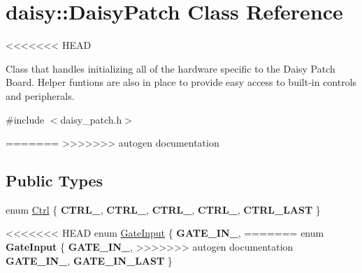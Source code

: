\hypertarget{classdaisy_1_1_daisy_patch}{}\section{daisy\+:\+:Daisy\+Patch Class Reference}
\label{classdaisy_1_1_daisy_patch}
<<<<<<< HEAD


Class that handles initializing all of the hardware specific to the Daisy Patch Board. Helper funtions are also in place to provide easy access to built-\/in controls and peripherals.  




{\ttfamily \#include $<$daisy\+\_\+patch.\+h$>$}

=======
>>>>>>> autogen documentation
\subsection*{Public Types}
\begin{DoxyCompactItemize}
\item 
enum \hyperlink{classdaisy_1_1_daisy_patch_aefa3638dd587fe20c48bbdfba3cd72b3}{Ctrl} \{ \newline
{\bfseries C\+T\+R\+L\+\_}, 
{\bfseries C\+T\+R\+L\+\_}, 
{\bfseries C\+T\+R\+L\+\_}, 
{\bfseries C\+T\+R\+L\+\_}, 
\newline
{\bfseries C\+T\+R\+L\+\_\+\+L\+A\+ST}
 \}
\item 
<<<<<<< HEAD
enum \hyperlink{classdaisy_1_1_daisy_patch_ac2ca484062f9527de2c4111022d86953}{Gate\+Input} \{ {\bfseries G\+A\+T\+E\+\_\+\+I\+N\+\_}, 
=======
\mbox{\label{classdaisy_1_1_daisy_patch_ac2ca484062f9527de2c4111022d86953}} 
enum {\bfseries Gate\+Input} \{ {\bfseries G\+A\+T\+E\+\_\+\+I\+N\+\_}, 
>>>>>>> autogen documentation
{\bfseries G\+A\+T\+E\+\_\+\+I\+N\+\_}, 
{\bfseries G\+A\+T\+E\+\_\+\+I\+N\+\_\+\+L\+A\+ST}
 \}
\end{DoxyCompactItemize}
